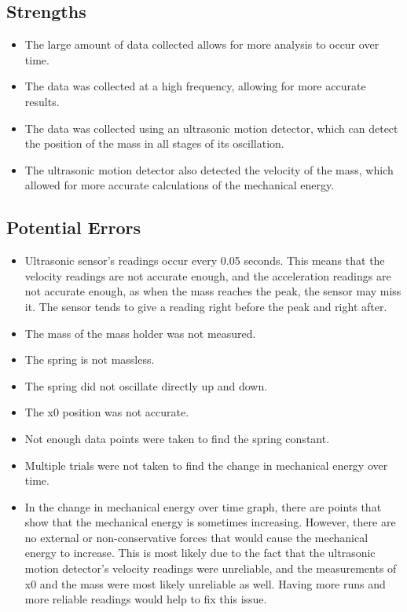 \documentclass[titlepage]{article}
\begin{document}
        \subsection{Strengths}
            \begin{itemize}
                \item The large amount of data collected allows for more analysis to occur over time.
                \item The data was collected at a high frequency, allowing for more accurate results.
                \item The data was collected using an ultrasonic motion detector, which can detect the position of the mass in all stages of its oscillation.
                \item The ultrasonic motion detector also detected the velocity of the mass, which allowed for more accurate calculations of the mechanical energy.
            \end{itemize}
        
        \subsection{Potential Errors}
            \begin{itemize}
                \item Ultrasonic sensor's readings occur every 0.05 seconds. This means that the velocity readings are not accurate enough, and the acceleration readings are not accurate enough, as when the mass reaches the peak, the sensor may miss it. The sensor tends to give a reading right before the peak and right after.
                \item The mass of the mass holder was not measured.
                \item The spring is not massless.
                \item The spring did not oscillate directly up and down.
                \item The x0 position was not accurate.
                \item Not enough data points were taken to find the spring constant.
                \item Multiple trials were not taken to find the change in mechanical energy over time.
                \item In the change in mechanical energy over time graph, there are points that show that the mechanical energy is sometimes increasing.
                However, there are no external or non-conservative forces that would cause the mechanical energy to increase.
                This is most likely due to the fact that the ultrasonic motion detector's velocity readings were unreliable, and the measurements of x0 and the mass were most likely unreliable as well.
                Having more runs and more reliable readings would help to fix this issue.
            \end{itemize}
        
\end{document}
